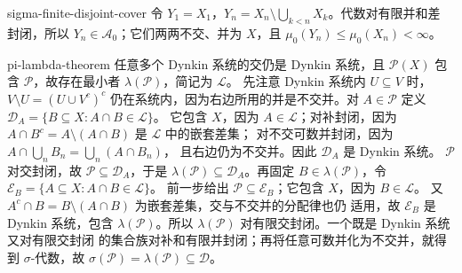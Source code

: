 \begin{solution}{sigma-finite-disjoint-cover}
令 $Y_1=X_1$，$Y_n=X_n\setminus\bigcup_{k<n}X_k$。代数对有限并和差
封闭，所以 $Y_n\in\mathcal A_0$；它们两两不交、并为 $X$，且
$\mu_0(Y_n)\le\mu_0(X_n)<\infty$。
\end{solution}

\begin{solution}{pi-lambda-theorem}
任意多个 Dynkin 系统的交仍是 Dynkin 系统，且 $\mathcal P(X)$ 包含
$\mathcal P$，故存在最小者 $\lambda(\mathcal P)$，简记为 $\mathcal L$。
先注意 Dynkin 系统内 $U\subseteq V$ 时，
$V\setminus U=(U\cup V^c)^c$ 仍在系统内，因为右边所用的并是不交并。对
$A\in\mathcal P$ 定义
$\mathcal D_A=\{B\subseteq X:A\cap B\in\mathcal L\}$。
它包含 $X$，因为 $A\in\mathcal L$；对补封闭，因为
$A\cap B^c=A\setminus(A\cap B)$ 是 $\mathcal L$ 中的嵌套差集；
对不交可数并封闭，因为 $A\cap\bigcup_nB_n=\bigcup_n(A\cap B_n)$，
且右边仍为不交并。因此 $\mathcal D_A$ 是 Dynkin 系统。
$\mathcal P$ 对交封闭，故 $\mathcal P\subseteq\mathcal D_A$，于是
$\lambda(\mathcal P)\subseteq\mathcal D_A$。再固定
$B\in\lambda(\mathcal P)$，令
$\mathcal E_B=\{A\subseteq X:A\cap B\in\mathcal L\}$。
前一步给出 $\mathcal P\subseteq\mathcal E_B$；它包含 $X$，因为 $B\in\mathcal L$。
又 $A^c\cap B=B\setminus(A\cap B)$ 为嵌套差集，交与不交并的分配律也仍
适用，故 $\mathcal E_B$ 是 Dynkin 系统，包含 $\lambda(\mathcal P)$。所以
$\lambda(\mathcal P)$ 对有限交封闭。一个既是 Dynkin 系统又对有限交封闭
的集合族对补和有限并封闭；再将任意可数并化为不交并，就得到
$\sigma$-代数，故
$\sigma(\mathcal P)=\lambda(\mathcal P)\subseteq\mathcal D$。
\end{solution}


